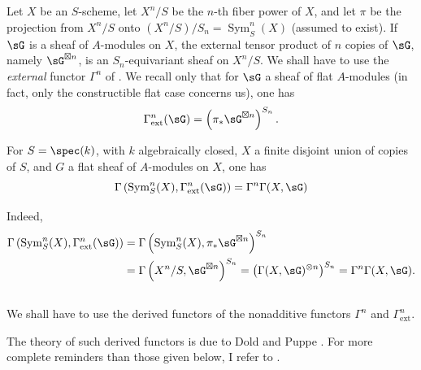 \subsection{}\label{III:1-2}

Let $X$ be an $S$-scheme, let $X^n/S$ be the $n$-th fiber power of $X$, and
let $\pi$ be the projection from $X^n/S$ onto
$(X^n/S)/S_n=\operatorname{Sym}_S^n(X)$ (assumed to exist). If $\sG$ is a
sheaf of $A$-modules on $X$, the external tensor product of $n$ copies of
$\sG$, namely $\sG^{\boxtimes n}$, is an $S_n$-equivariant sheaf on $X^n/S$.
We shall have to use the \emph{external} functor $\Gamma^n$ of
. We recall only that for $\sG$ a sheaf of flat
$A$-modules (in fact, only the constructible flat case concerns us), one has
\[
  \Gamma_\text{ext}^n(\sG) = \left(\pi_*\sG^{\boxtimes n}\right)^{S_n} \text{.}
\]






\begin{lemma_}\label{III:1-3}
For $S=\spec(k)$, with $k$ algebraically closed, $X$ a finite disjoint union of
copies of $S$, and $G$ a flat sheaf of $A$-modules on $X$, one has
\[
  \Gamma\left(\operatorname{Sym}_S^n(X),\Gamma_\text{ext}^n(\sG)\right) = \Gamma^n \Gamma(X,\sG)
\]
\end{lemma_}

Indeed,
\begin{align*}
  \Gamma\left(\operatorname{Sym}_S^n(X),\Gamma_\text{ext}^n(\sG)\right)
    &= \Gamma\left(\operatorname{Sym}_S^n(X),\pi_*\sG^{\boxtimes n}\right)^{S_n} \\
    &= \Gamma\left(X^n/S,\sG^{\boxtimes n}\right)^{S_n}
    = \left(\Gamma(X,\sG)^{\otimes n}\right)^{S_n}
    = \Gamma^n \Gamma(X,\sG) \text{.}
\end{align*}






\subsection{}\label{III:1-4}

We shall have to use the derived functors of the nonadditive functors
$\Gamma^n$ and $\Gamma_\text{ext}^n$.

The theory of such derived functors is due to Dold and Puppe
. For more complete reminders than those given below, I refer to
.

